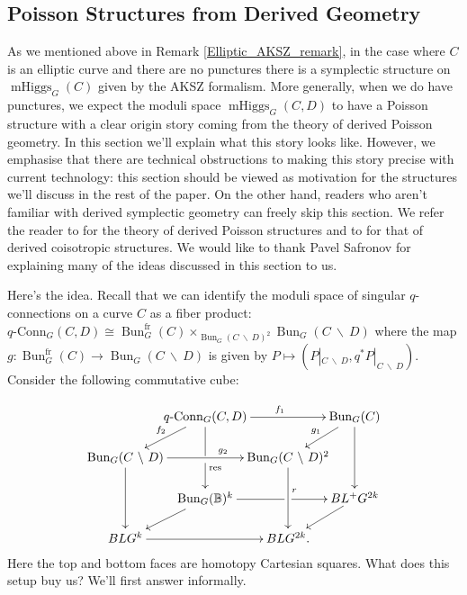 \documentclass[11pt, oneside, reqno]{amsart}
\theoremstyle{definition} \newtheorem{definition}{Definition}[section]
\theoremstyle{definition} \newtheorem{remark}[definition]{Remark}
\theoremstyle{definition} \newtheorem{remarks}[definition]{Remarks}
\theoremstyle{definition} \newtheorem{question}[definition]{Question}
\theoremstyle{definition} \newtheorem*{note}{Note}
\theoremstyle{definition} \newtheorem{example}[definition]{Example}
\theoremstyle{definition} \newtheorem{examples}[definition]{Examples}
\newcommand{\bb}[1]{\mathbb{#1}}
\newcommand{\mr}[1]{\mathrm{#1}}
\newcommand{\bs}{\ \backslash \ }
\newcommand{\iso}{\cong}
\DeclareMathOperator{\bun}{Bun}
\DeclareMathOperator{\mhiggs}{mHiggs}
\newcommand{\qconn}{q\text{-Conn}}
\newcommand{\fr}{\mathrm{fr}}
\begin{document}
\subsection{Poisson Structures from Derived Geometry}
As we mentioned above in Remark \ref{Elliptic_AKSZ_remark}, in the case where $C$ is an elliptic curve and there are no punctures there is a symplectic structure on $\mhiggs_G(C)$ given by the AKSZ formalism.  More generally, when we do have punctures, we expect the moduli space $\mhiggs_G(C,D)$ to have a Poisson structure with a clear origin story coming from the theory of derived Poisson geometry.  In this section we'll explain what this story looks like.  However, we emphasise that there are technical obstructions to making this story precise with current technology: this section should be viewed as motivation for the structures we'll discuss in the rest of the paper.  On the other hand, readers who aren't familiar with derived symplectic geometry can freely skip this section.  We refer the reader to \cite{CPTVV} for the theory of derived Poisson structures and to \cite{MelaniSafronov1, MelaniSafronov2, Spaide} for that of derived coisotropic structures.  We would like to thank Pavel Safronov for explaining many of the ideas discussed in this section to us.

Here's the idea.  Recall that we can identify the moduli space of singular $q$-connections on a curve $C$ as a fiber product: $\qconn_G(C, D) \iso \bun_G^\fr(C) \times_{\bun_G(C \! \bs \! D)^2} \bun_G(C \! \bs \! D)$ where the map $g \colon \bun_G^\fr(C) \to \bun_G(C \! \bs \! D)$ is given by $P \mapsto (P|_{C \! \bs \! D}, q^*P|_{C \! \bs \! D})$.  Consider the following commutative cube:

\[\xymatrix@C-30pt@R-8pt{
& \qconn_G(C, D) \ar[rr]^{f_1} \ar'[d][dd]^(.25){\mr{res}} & & \bun_G(C) \ar[dd]
\\
\bun_G(C \bs D) \ar@{<-}[ur]^{f_2} \ar[rr]^(.6){g_2} \ar[dd] & & \bun_G(C \bs D)^2 \ar@{<-}[ur]^{g_1} \ar[dd]^(.4)r
\\
& \bun_G(\bb B)^k \ar'[r][rr] & & BL^+G^{2k}
\\
BLG^k \ar[rr]\ar@{<-}[ur] & & BLG^{2k}. \ar@{<-}[ur]
}\]
Here the top and bottom faces are homotopy Cartesian squares.  What does this setup buy us?  We'll first answer informally.
\end{document}

